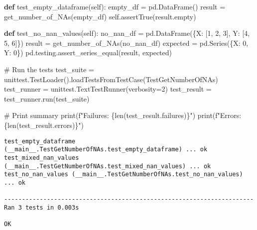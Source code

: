 \documentclass[
  letterpaper,
  DIV=11,
  numbers=noendperiod]{scrartcl}
\newenvironment{Shaded}{\begin{snugshade}}{\end{snugshade}}
\newcommand{\BuiltInTok}[1]{\textcolor[rgb]{0.00,0.23,0.31}{#1}}
\newcommand{\CommentTok}[1]{\textcolor[rgb]{0.37,0.37,0.37}{#1}}
\newcommand{\DecValTok}[1]{\textcolor[rgb]{0.68,0.00,0.00}{#1}}
\newcommand{\KeywordTok}[1]{\textcolor[rgb]{0.00,0.23,0.31}{\textbf{#1}}}
\newcommand{\NormalTok}[1]{\textcolor[rgb]{0.00,0.23,0.31}{#1}}
\newcommand{\OperatorTok}[1]{\textcolor[rgb]{0.37,0.37,0.37}{#1}}
\newcommand{\SpecialCharTok}[1]{\textcolor[rgb]{0.37,0.37,0.37}{#1}}
\newcommand{\SpecialStringTok}[1]{\textcolor[rgb]{0.13,0.47,0.30}{#1}}
\newcommand{\StringTok}[1]{\textcolor[rgb]{0.13,0.47,0.30}{#1}}
\newcommand{\VariableTok}[1]{\textcolor[rgb]{0.07,0.07,0.07}{#1}}
\begin{document}
\begin{Shaded}
\begin{Highlighting}[]
    \KeywordTok{def}\NormalTok{ test\_empty\_dataframe(}\VariableTok{self}\NormalTok{):}
\NormalTok{        empty\_df }\OperatorTok{=}\NormalTok{ pd.DataFrame()}
\NormalTok{        result }\OperatorTok{=}\NormalTok{ get\_number\_of\_NAs(empty\_df)}
        \VariableTok{self}\NormalTok{.assertTrue(result.empty)}

    \KeywordTok{def}\NormalTok{ test\_no\_nan\_values(}\VariableTok{self}\NormalTok{):}
\NormalTok{        no\_nan\_df }\OperatorTok{=}\NormalTok{ pd.DataFrame(\{}\StringTok{\textquotesingle{}X\textquotesingle{}}\NormalTok{: [}\DecValTok{1}\NormalTok{, }\DecValTok{2}\NormalTok{, }\DecValTok{3}\NormalTok{], }\StringTok{\textquotesingle{}Y\textquotesingle{}}\NormalTok{: [}\DecValTok{4}\NormalTok{, }\DecValTok{5}\NormalTok{, }\DecValTok{6}\NormalTok{]\})}
\NormalTok{        result }\OperatorTok{=}\NormalTok{ get\_number\_of\_NAs(no\_nan\_df)}
\NormalTok{        expected }\OperatorTok{=}\NormalTok{ pd.Series(\{}\StringTok{\textquotesingle{}X\textquotesingle{}}\NormalTok{: }\DecValTok{0}\NormalTok{, }\StringTok{\textquotesingle{}Y\textquotesingle{}}\NormalTok{: }\DecValTok{0}\NormalTok{\})}
\NormalTok{        pd.testing.assert\_series\_equal(result, expected)}

\CommentTok{\# Run the tests}
\NormalTok{test\_suite }\OperatorTok{=}\NormalTok{ unittest.TestLoader().loadTestsFromTestCase(TestGetNumberOfNAs)}
\NormalTok{test\_runner }\OperatorTok{=}\NormalTok{ unittest.TextTestRunner(verbosity}\OperatorTok{=}\DecValTok{2}\NormalTok{)}
\NormalTok{test\_result }\OperatorTok{=}\NormalTok{ test\_runner.run(test\_suite)}

\CommentTok{\# Print summary}
\BuiltInTok{print}\NormalTok{(}\SpecialStringTok{f"Failures: }\SpecialCharTok{\{}\BuiltInTok{len}\NormalTok{(test\_result.failures)}\SpecialCharTok{\}}\SpecialStringTok{"}\NormalTok{)}
\BuiltInTok{print}\NormalTok{(}\SpecialStringTok{f"Errors: }\SpecialCharTok{\{}\BuiltInTok{len}\NormalTok{(test\_result.errors)}\SpecialCharTok{\}}\SpecialStringTok{"}\NormalTok{)}
\end{Highlighting}
\end{Shaded}

\begin{verbatim}
test_empty_dataframe (__main__.TestGetNumberOfNAs.test_empty_dataframe) ... ok
test_mixed_nan_values (__main__.TestGetNumberOfNAs.test_mixed_nan_values) ... ok
test_no_nan_values (__main__.TestGetNumberOfNAs.test_no_nan_values) ... ok

----------------------------------------------------------------------
Ran 3 tests in 0.003s

OK
\end{verbatim}
\end{document}
